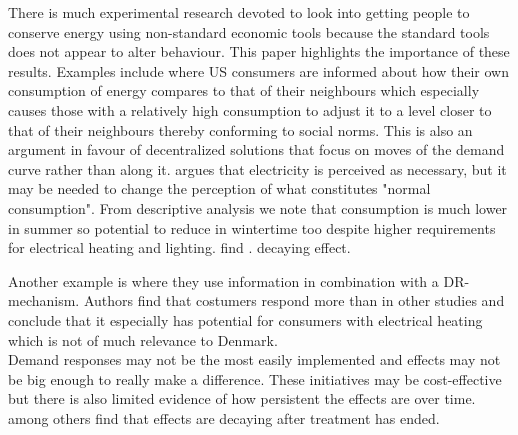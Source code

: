 There is much experimental research devoted to look into getting people to conserve energy using non-standard economic tools because the standard tools does not appear to alter behaviour. This paper highlights the importance of these results. Examples include \cite{allcott2011social} where US consumers are informed about how their own consumption of energy compares to that of their neighbours which especially causes those with a relatively high consumption to adjust it to a level closer to that of their neighbours thereby conforming to social norms. This is also an argument in favour of decentralized solutions that focus on moves of the demand curve rather than along it. \cite{kirschen2003demand} argues that electricity is perceived as necessary, but it may be needed to change the perception of what constitutes "normal consumption". From descriptive analysis we note that consumption is much lower in summer so potential to reduce in wintertime too despite higher requirements for electrical heating and lighting.
\cite{allcott2014short} find . decaying effect.


Another example is \citep{saele2011demand} where they use information in combination with a DR-mechanism. Authors find that costumers respond more than in other studies and conclude that it especially has potential for consumers with electrical heating which is not of much relevance to Denmark.\smallskip \\

Demand responses may not be the most easily implemented and effects may not be big enough to really make a difference. These initiatives may be cost-effective but there is also limited evidence of how persistent the effects are over time. \cite{allcott2014short} among others find that effects are decaying after treatment has ended. \smallskip \\


